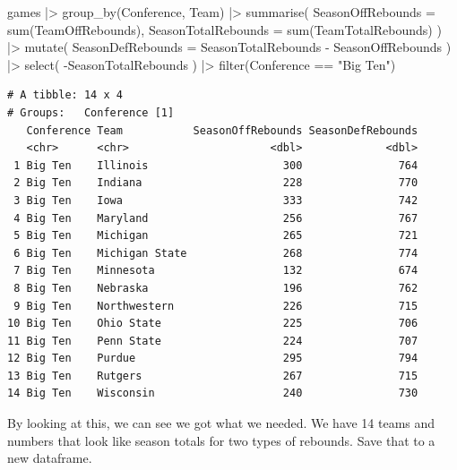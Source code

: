 \documentclass[
  letterpaper,
  DIV=11,
  numbers=noendperiod]{scrreprt}
\newenvironment{Shaded}{\begin{snugshade}}{\end{snugshade}}
\newcommand{\AttributeTok}[1]{\textcolor[rgb]{0.40,0.45,0.13}{#1}}
\newcommand{\FunctionTok}[1]{\textcolor[rgb]{0.28,0.35,0.67}{#1}}
\newcommand{\NormalTok}[1]{\textcolor[rgb]{0.00,0.23,0.31}{#1}}
\newcommand{\SpecialCharTok}[1]{\textcolor[rgb]{0.37,0.37,0.37}{#1}}
\newcommand{\StringTok}[1]{\textcolor[rgb]{0.13,0.47,0.30}{#1}}
\begin{document}
\begin{Shaded}
\begin{Highlighting}[]
\NormalTok{games }\SpecialCharTok{|\textgreater{}} 
  \FunctionTok{group\_by}\NormalTok{(Conference, Team) }\SpecialCharTok{|\textgreater{}} 
  \FunctionTok{summarise}\NormalTok{(}
    \AttributeTok{SeasonOffRebounds =} \FunctionTok{sum}\NormalTok{(TeamOffRebounds),}
    \AttributeTok{SeasonTotalRebounds =} \FunctionTok{sum}\NormalTok{(TeamTotalRebounds)}
\NormalTok{  ) }\SpecialCharTok{|\textgreater{}}
  \FunctionTok{mutate}\NormalTok{(}
    \AttributeTok{SeasonDefRebounds =}\NormalTok{ SeasonTotalRebounds }\SpecialCharTok{{-}}\NormalTok{ SeasonOffRebounds}
\NormalTok{  ) }\SpecialCharTok{|\textgreater{}} 
  \FunctionTok{select}\NormalTok{(}
    \SpecialCharTok{{-}}\NormalTok{SeasonTotalRebounds}
\NormalTok{  ) }\SpecialCharTok{|\textgreater{}} 
  \FunctionTok{filter}\NormalTok{(Conference }\SpecialCharTok{==} \StringTok{"Big Ten"}\NormalTok{)}
\end{Highlighting}
\end{Shaded}

\begin{verbatim}
# A tibble: 14 x 4
# Groups:   Conference [1]
   Conference Team           SeasonOffRebounds SeasonDefRebounds
   <chr>      <chr>                      <dbl>             <dbl>
 1 Big Ten    Illinois                     300               764
 2 Big Ten    Indiana                      228               770
 3 Big Ten    Iowa                         333               742
 4 Big Ten    Maryland                     256               767
 5 Big Ten    Michigan                     265               721
 6 Big Ten    Michigan State               268               774
 7 Big Ten    Minnesota                    132               674
 8 Big Ten    Nebraska                     196               762
 9 Big Ten    Northwestern                 226               715
10 Big Ten    Ohio State                   225               706
11 Big Ten    Penn State                   224               707
12 Big Ten    Purdue                       295               794
13 Big Ten    Rutgers                      267               715
14 Big Ten    Wisconsin                    240               730
\end{verbatim}

By looking at this, we can see we got what we needed. We have 14 teams
and numbers that look like season totals for two types of rebounds. Save
that to a new dataframe.
\end{document}
